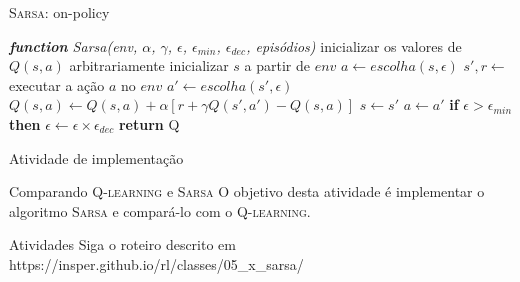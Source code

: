 \documentclass{beamer}
\begin{document}
\begin{frame}{\textsc{Sarsa}: on-policy}
\begin{algorithmic} 
	\STATE \emph{\textbf{function} Sarsa(env, $\alpha$, $\gamma$, $\epsilon$, $\epsilon_{min}$, $\epsilon_{dec}$, episódios)}
	\STATE inicializar os valores de $Q(s, a)$ arbitrariamente
	\STATE inicializar $s$ a partir de $env$
	\STATE \HiLi $a \leftarrow escolha(s, \epsilon)$
	\REPEAT
	\STATE $s', r \leftarrow$ executar a ação $a$ no $env$
	\STATE \HiLi $a' \leftarrow escolha(s', \epsilon)$
	\STATE \HiLi $Q(s,a) \leftarrow Q(s,a) + \alpha [r +\gamma Q(s', a') - Q(s,a)]$
	\STATE $s  \leftarrow s'$
	\STATE \HiLi $a  \leftarrow a'$
	\STATE \textbf{if} $\epsilon > \epsilon_{min}$ \textbf{then} $\epsilon \leftarrow \epsilon \times \epsilon_{dec}$
	\ENDFOR
	\STATE \textbf{return} Q
\end{algorithmic}	
\end{frame}

\begin{frame}{Atividade de implementação}
	
	\begin{alertblock}{Comparando \textsc{Q-learning} e \textsc{Sarsa}}
		O objetivo desta atividade é implementar o algoritmo \textsc{Sarsa} e compará-lo com o \textsc{Q-learning}.
	\end{alertblock}
	
	\begin{block}{Atividades}
	Siga o roteiro descrito em https://insper.github.io/rl/classes/05\_x\_sarsa/ \href{https://insper.github.io/rl/classes/05_x_sarsa/}
	{}
	\end{block}

\end{frame} 



%
%
\end{document}

